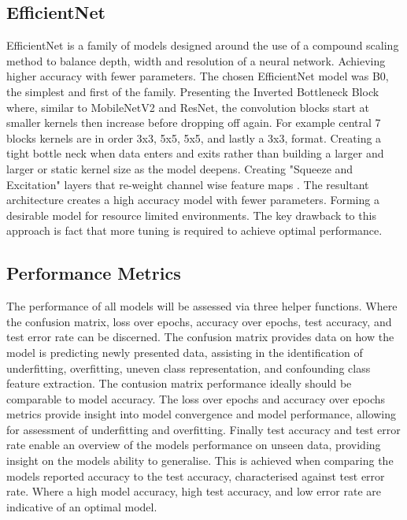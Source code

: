\documentclass[10pt,twocolumn,letterpaper]{article}
\begin{document}
\subsection{EfficientNet}
EfficientNet is a family of models designed around the use of a compound scaling method to balance depth, width and resolution of a neural network. Achieving higher accuracy with fewer parameters. The chosen EfficientNet model was B0, the simplest and first of the family. Presenting the Inverted Bottleneck Block where, similar to MobileNetV2 and ResNet, the convolution blocks start at smaller kernels then increase before dropping off again. For example central 7 blocks kernels are in order 3x3, 5x5, 5x5, and lastly a 3x3, format. Creating a tight bottle neck when data enters and exits rather than building a larger and larger or static kernel size as the model deepens. Creating "Squeeze and Excitation" layers that re-weight channel wise feature maps \cite{original_efficientnet} \cite{fintuningefficientnet}. The resultant architecture creates a high accuracy model with fewer parameters. Forming a desirable model for resource limited environments. The key drawback to this approach is fact that more tuning is required to achieve optimal performance.

\subsection{Performance Metrics}
The performance of all models will be assessed via three helper functions. Where the confusion matrix, loss over epochs, accuracy over epochs, test accuracy, and test error rate can be discerned. The confusion matrix provides data on how the model is predicting newly presented data, assisting in the identification of underfitting, overfitting, uneven class representation, and confounding class feature extraction. The contusion matrix performance ideally should be comparable to model accuracy. The loss over epochs and accuracy over epochs metrics provide insight into model convergence and model performance, allowing for assessment of underfitting and overfitting. Finally test accuracy and test error rate enable an overview of the models performance on unseen data, providing insight on the models ability to generalise. This is achieved when comparing the models reported accuracy to the test accuracy, characterised against test error rate. Where a high model accuracy, high test accuracy, and low error rate are indicative of an optimal model. 
\end{document}
